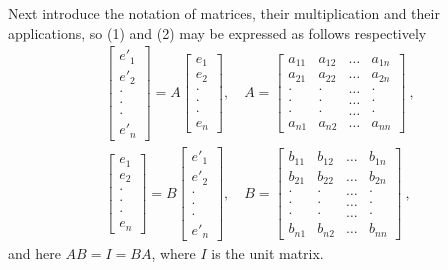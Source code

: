 Next introduce the notation of matrices, their multiplication and
their applications, so (1) and (2) may be expressed as follows
respectively
\begin{align*}
\begin{bmatrix}
e'_1\\
e'_2\\
\cdot\\
\cdot\\
\cdot\\
e'_n
\end{bmatrix} = A 
\begin{bmatrix}
e_1 \\
e_2 \\
\cdot\\
\cdot\\
\cdot\\
e_n
\end{bmatrix} , \quad A  = 
\begin{bmatrix}
a_{11} & a_{12} & \ldots & a_{1n} \\
a_{21} & a_{22} & \ldots & a_{2n} \\
\cdot & \cdot & \ldots & \cdot\\
\cdot & \cdot & \ldots & \cdot\\
\cdot & \cdot & \ldots & \cdot\\
a_{n1} & a_{n2} & \ldots & a_{nn}
\end{bmatrix}~,\\
\begin{bmatrix}
e_1\\
e_2\\
\cdot\\
\cdot\\
\cdot\\
e_n
\end{bmatrix} = B 
\begin{bmatrix}
e'_1 \\
e'_2 \\
\cdot\\
\cdot\\
\cdot\\
e'_n
\end{bmatrix} , \quad B  = 
\begin{bmatrix}
b_{11} & b_{12} & \ldots & b_{1n} \\
b_{21} & b_{22} & \ldots & b_{2n} \\
\cdot & \cdot & \ldots & \cdot\\
\cdot & \cdot & \ldots & \cdot\\
\cdot & \cdot & \ldots & \cdot\\
b_{n1} & b_{n2} & \ldots & b_{nn}
\end{bmatrix}~,
\end{align*}
and here $AB = I = BA$, where $I$ is the unit matrix.

